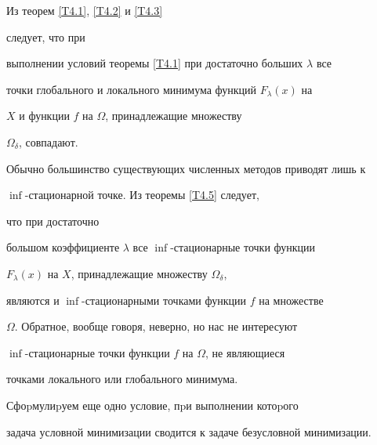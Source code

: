 \begin{notes}


Из теорем \ref{T4.1}, \ref{T4.2} и \ref{T4.3}


следует, что при


выполнении условий теоремы \ref{T4.1} при достаточно больших $\lambda$ все


точки глобального и локального минимума функций $F_{\lambda}(x)$ на


$X$ и функции $f$ на $\Omega$, принадлежащие множеству


$\Omega_{\delta}$, совпадают.





Обычно большинство существующих численных методов приводят лишь к


$\inf$-ста\-ци\-о\-нар\-ной точке. Из теоремы \ref{T4.5} следует,


что при достаточно


большом коэффициенте $\lambda$ все $\inf$-ста\-ци\-о\-нар\-ные точки функции


$F_{\lambda}(x)$ на $X$, принадлежащие множеству $\Omega _{\delta}$,


являются и $\inf$-ста\-ци\-о\-нар\-ными точками функции $f$ на множестве


$\Omega$. Обратное, вообще говоря, неверно, но нас не интересуют


$\inf$-ста\-ци\-о\-нар\-ные точки функции $f$ на $\Omega$, не являющиеся


точками локального или глобального минимума.


\end{notes}








Сфоpмулиpуем еще одно условие, пpи выполнении котоpого


задача условной минимизации сводится к задаче безусловной минимизации.





